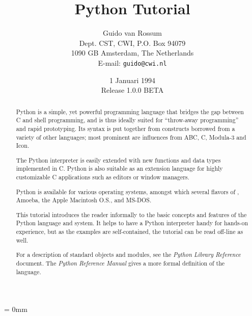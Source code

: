 
\title{Python Tutorial}
	
\author{
	Guido van Rossum \\
	Dept. CST, CWI, P.O. Box 94079 \\
	1090 GB Amsterdam, The Netherlands \\
	E-mail: {\tt guido@cwi.nl}
}

\date{1 Januari 1994 \\ Release 1.0.0 BETA} %




\maketitle

\begin{abstract}

\noindent
Python is a simple, yet powerful programming language that bridges the
gap between C and shell programming, and is thus ideally suited for
``throw-away programming''
and rapid prototyping.  Its syntax is put
together from constructs borrowed from a variety of other languages;
most prominent are influences from ABC, C, Modula-3 and Icon.

The Python interpreter is easily extended with new functions and data
types implemented in C.  Python is also suitable as an extension
language for highly customizable C applications such as editors or
window managers.

Python is available for various operating systems, amongst which
several flavors of {\UNIX}, Amoeba, the Apple Macintosh O.S.,
and MS-DOS.

This tutorial introduces the reader informally to the basic concepts
and features of the Python language and system.  It helps to have a
Python interpreter handy for hands-on experience, but as the examples
are self-contained, the tutorial can be read off-line as well.

For a description of standard objects and modules, see the {\em Python
Library Reference} document.  The {\em Python Reference Manual} gives
a more formal definition of the language.

\end{abstract}

\pagebreak
{
\parskip = 0mm
\tableofcontents
}

\pagebreak

